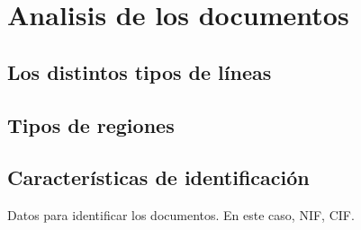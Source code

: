 \section{Analisis de los documentos}

\subsection{Los distintos tipos de líneas}

\subsection{Tipos de regiones}

\subsection{Características de identificación}

Datos para identificar los documentos. En este caso, NIF, CIF.
